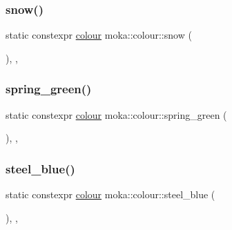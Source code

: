\mbox{\label{classmoka_1_1colour_a8e6a77758527c390aee243a253b494ef}} 
\subsubsection{\texorpdfstring{snow()}{snow()}}
{\footnotesize\ttfamily static constexpr \mbox{\hyperlink{classmoka_1_1colour}{colour}} moka\+::colour\+::snow (\begin{DoxyParamCaption}{ }\end{DoxyParamCaption})\hspace{0.3cm}{\ttfamily [inline]}, {\ttfamily [static]}, {\ttfamily [noexcept]}}

\mbox{\label{classmoka_1_1colour_a95eaa33785dd3aa5591e236410916e5d}} 
\subsubsection{\texorpdfstring{spring\_green()}{spring\_green()}}
{\footnotesize\ttfamily static constexpr \mbox{\hyperlink{classmoka_1_1colour}{colour}} moka\+::colour\+::spring\+\_\+green (\begin{DoxyParamCaption}{ }\end{DoxyParamCaption})\hspace{0.3cm}{\ttfamily [inline]}, {\ttfamily [static]}, {\ttfamily [noexcept]}}

\mbox{\label{classmoka_1_1colour_a83ed36e0f5d8372078f46948743ee244}} 
\subsubsection{\texorpdfstring{steel\_blue()}{steel\_blue()}}
{\footnotesize\ttfamily static constexpr \mbox{\hyperlink{classmoka_1_1colour}{colour}} moka\+::colour\+::steel\+\_\+blue (\begin{DoxyParamCaption}{ }\end{DoxyParamCaption})\hspace{0.3cm}{\ttfamily [inline]}, {\ttfamily [static]}, {\ttfamily [noexcept]}}


